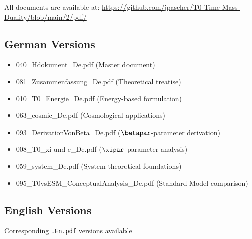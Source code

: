 All documents are available at: \url{https://github.com/jpascher/T0-Time-Mass-Duality/blob/main/2/pdf/}

\subsection{German Versions}

\begin{itemize}
	\item 040\_Hdokument\_De.pdf (Master document)
	\item 081\_Zusammenfassung\_De.pdf (Theoretical treatise)
	\item 010\_T0\_Energie\_De.pdf (Energy-based formulation)
	\item 063\_cosmic\_De.pdf (Cosmological applications)
	\item 093\_DerivationVonBeta\_De.pdf ($\betapar$-parameter derivation)
	\item 008\_T0\_xi-und-e\_De.pdf ($\xipar$-parameter analysis)
	\item 059\_system\_De.pdf (System-theoretical foundations)
	\item 095\_T0vsESM\_ConceptualAnalysis\_De.pdf (Standard Model comparison)
\end{itemize}

\subsection{English Versions}

Corresponding \texttt{.En.pdf} versions available